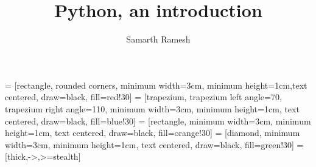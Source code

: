 \documentclass[12pt,a4paper, x11names]{book}
\title{Python, an introduction}
\author{Samarth Ramesh}
\date{}
\begin{document}
 = [rectangle, rounded corners, minimum width=3cm, minimum height=1cm,text centered, draw=black, fill=red!30]
 = [trapezium, trapezium left angle=70, trapezium right angle=110, minimum width=3cm, minimum height=1cm, text centered, draw=black, fill=blue!30]
 = [rectangle, minimum width=3cm, minimum height=1cm, text centered, draw=black, fill=orange!30]
 = [diamond, minimum width=3cm, minimum height=1cm, text centered, draw=black, fill=green!30]
 = [thick,->,>=stealth]

\maketitle
{}



\end{document}
